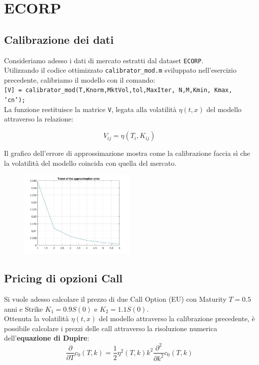 \documentclass[11pt]{article}
\begin{document}
\vfill
\section{ECORP}

\subsection{Calibrazione dei dati}
Consideriamo adesso i dati di mercato estratti dal dataset \texttt{ECORP}.\\
Utilizzando il codice ottimizzato \texttt{calibrator\_mod.m} sviluppato nell'esercizio precedente, calibriamo il modello con il comando:\\

\texttt{[V] = calibrator\_mod(T,Knorm,MktVol,tol,MaxIter, N,M,Kmin, Kmax, 'cn');}\\

La funzione restituisce la matrice \texttt{V}, legata alla volatilità $\eta(t,x)$ del modello attraverso la relazione:

\begin{equation}
V_{ij} = \eta(T_i,K_{ij})
\end{equation}

Il grafico dell'errore di approssimazione mostra come la calibrazione faccia sì che la volatilità del modello coincida con quella del mercato.

\begin{figure}[H]
\centering
\includegraphics[width=0.5\textwidth]{cal}
\end{figure}

\subsection{Pricing di opzioni Call}
Si vuole adesso calcolare il prezzo di due Call Option (EU) con Maturity $T=0.5$ anni e Strike $K_1 = 0.9 S(0)$ e $K_2 = 1.1S(0)$.\\
Ottenuta la volatilità $\eta(t,x)$ del modello attraverso la calibrazione precedente, è possibile calcolare i prezzi delle call attraverso la risoluzione numerica dell'\textbf{equazione di Dupire}:
\begin{equation}
\frac{\partial}{\partial T}c_0(T,k) = \frac{1}{2}\eta^2(T,k)k^2\frac{\partial^2}{\partial k^2}c_0(T,k)
\end{equation} 
\end{document}
